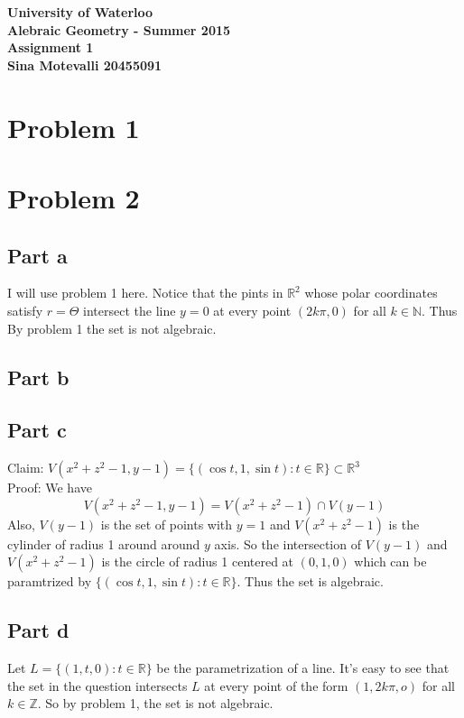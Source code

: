 \documentclass[12pt]{article}
\begin{document}
\begin{center}
  {\Large\bf University of Waterloo}\\
  \vspace{3mm}
         {\Large\bf Alebraic Geometry - Summer 2015}\\
         \vspace{2mm}
                {\Large\bf Assignment 1}\\
                \vspace{3mm}
                \textbf{Sina Motevalli 20455091}
\end{center}
\section*{Problem 1}

\section*{Problem 2}
\subsection*{Part a}
I will use problem 1 here. Notice that the pints in $\mathbb{R}^2$ whose polar coordinates satisfy $r=\Theta$ intersect the line $y=0$ at every point $(2k\pi, 0)$ for all $k \in \mathbb{N}$. Thus By problem 1 the set is not algebraic.
\subsection*{Part b}

\subsection*{Part c}
Claim: $V(x^2+z^2-1,y-1) =\{(\cos t,1,\sin t):t \in \mathbb{R}\} \subset \mathbb{R}^3$ \\
Proof: We have
$$V(x^2+z^2-1,y-1) = V(x^2+z^2-1) \cap V(y-1)$$
Also, $V(y-1)$ is the set of points with $y=1$ and
$V(x^2+z^2-1)$ is the cylinder of radius 1 around around $y$ axis. So the intersection of $V(y-1)$ and $V(x^2+z^2-1)$ is the circle of radius 1 centered at $(0,1,0)$ which can be paramtrized by $\{(\cos t,1,\sin t):t \in \mathbb{R}\}$. Thus the set is algebraic.
\subsection*{Part d}
Let $L=\{(1,t,0): t \in \mathbb{R}\}$ be the parametrization of a line. It's easy to see that the set in the question intersects $L$ at every point of the form $(1,2k\pi,o)$ for all $k \in \mathbb{Z}$. So by problem 1, the set is not algebraic.
\end{document}
